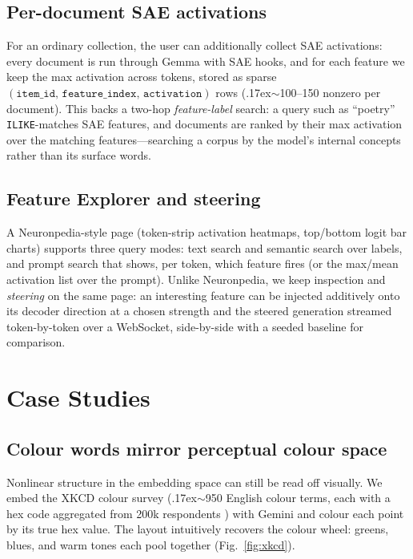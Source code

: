 \documentclass[11pt]{article}
\begin{document}
\subsection{Per-document SAE activations}
For an ordinary collection, the user can additionally collect SAE
activations: every document is run through Gemma with SAE hooks, and for
each feature we keep the max activation across tokens, stored as sparse
\((\texttt{item\_id, feature\_index, activation})\) rows
(\raise.17ex\hbox{$\scriptstyle\sim$}100--150 nonzero per document). This
backs a two-hop \emph{feature-label} search: a query such as
``poetry'' \texttt{ILIKE}-matches SAE features, and documents are ranked by
their max activation over the matching features---searching a corpus by the
model's internal concepts rather than its surface words.

\subsection{Feature Explorer and steering}
A Neuronpedia-style page (token-strip activation heatmaps, top/bottom logit
bar charts) supports three query modes: text search and semantic search
over labels, and prompt search that shows, per token, which feature fires
(or the max/mean activation list over the prompt). Unlike Neuronpedia, we
keep inspection and \emph{steering} on the same page: an interesting
feature can be injected additively onto its decoder direction at a chosen
strength and the steered generation streamed token-by-token over a
WebSocket, side-by-side with a seeded baseline for comparison.

\section{Case Studies}
\label{sec:cases}

\subsection{Colour words mirror perceptual colour space}
\label{sec:xkcd}
Nonlinear structure in the embedding space can still be read off visually.
We embed the XKCD colour survey (\raise.17ex\hbox{$\scriptstyle\sim$}950
English colour terms, each with a hex code aggregated from 200k
respondents \citep{xkcd}) with Gemini and colour each point by its true
hex value. The layout intuitively recovers the colour wheel: greens,
blues, and warm tones each pool together (Fig.~\ref{fig:xkcd}).
\end{document}
